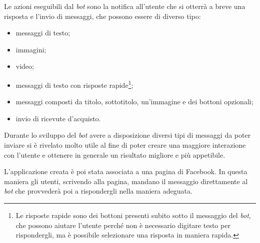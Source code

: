 Le azioni eseguibili dal \textit{bot} sono la notifica all'utente che si
otterrà a breve una risposta e l'invio di messaggi, che possono essere di
diverso tipo:
\begin{itemize}
  \item messaggi di testo;
  \item immagini;
  \item video;
  \item messaggi di testo con risposte rapide\footnote{Le risposte rapide sono
dei bottoni presenti subito sotto il messaggio del \textit{bot}, che possono
aiutare l'utente perché non è necessario digitare testo per rispondergli, ma è
possibile selezionare una risposta in maniera rapida.};
  \item messaggi composti da titolo, sottotitolo, un'immagine e dei bottoni
opzionali;
  \item invio di ricevute d'acquisto.
\end{itemize}

Durante lo sviluppo del \textit{bot} avere a disposizione diversi tipi di
messaggi da poter inviare si è rivelato molto utile al fine di poter creare una
maggiore interazione con l'utente e ottenere in generale un risultato migliore
e più appetibile.

L'applicazione creata è poi stata associata a una pagina di Facebook. In questa
maniera gli utenti, scrivendo alla pagina, mandano il messaggio direttamente al
\textit{bot} che provvederà poi a rispondergli nella maniera adeguata.


